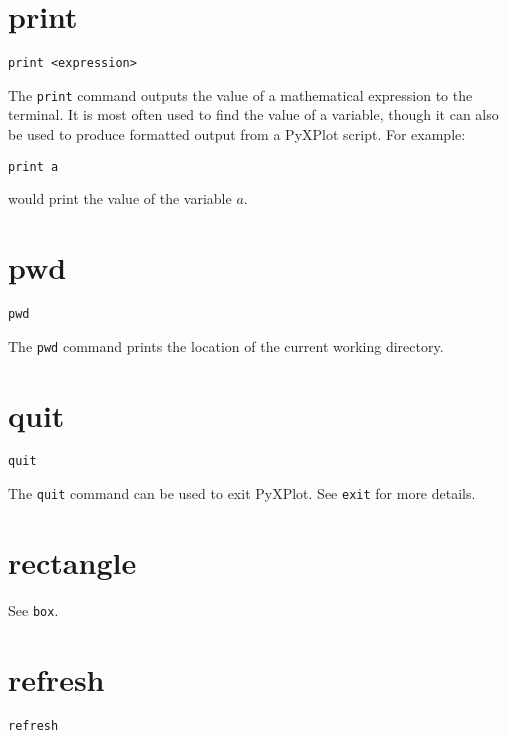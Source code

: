 \section{print}

\begin{verbatim}
print <expression>
\end{verbatim}

The {\tt print} command outputs the value of a mathematical expression to the
terminal.  It is most often used to find the value of a variable, though it can
also be used to produce formatted output from a PyXPlot script. For example:

\begin{verbatim}
print a
\end{verbatim}

\noindent would print the value of the variable $a$.


\section{pwd}

\begin{verbatim}
pwd
\end{verbatim}

The {\tt pwd} command prints the location of the current working directory.


\section{quit}

\begin{verbatim}
quit
\end{verbatim}

The {\tt quit} command can be used to exit PyXPlot. See {\tt exit} for more
details.


\section{rectangle}

See {\tt box}.

\section{refresh}

\begin{verbatim}
refresh
\end{verbatim}

